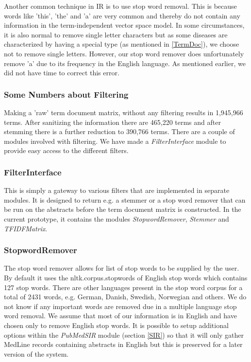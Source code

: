 Another common technique in IR is to use stop word removal. This is
because words like 'this', 'the' and 'a' are very common and thereby
do not contain any information in the term-independent vector space
model. In some circumstances, it is also normal to remove single letter
characters but as some diseases are characterized by having a special
type (as mentioned in \ref{TermDoc}), we choose not to remove single
letters. However, our stop word remover does unfortunately remove 'a'
due to its frequency in the English language. As mentioned earlier, we
did not have time to correct this error.

\subsubsection{Some Numbers about Filtering}
Making a 'raw' term document matrix, without any filtering results in
1,945,966 terms. After sanitizing the information there are 465,220 terms 
and after stemming there is a further reduction to 390,766 terms.
There are a couple of modules involved with filtering. We have made a
\textit{FilterInterface} module to provide easy access to the different
filters.

\subsubsection{FilterInterface}
This is simply a gateway to various filters that are implemented in
separate modules. It is designed to return e.g. a stemmer or a stop
word remover that can be run on the abstracts before the term document
matrix is constructed. In the current prototype, it contains the
modules \textit{StopwordRemover}, \textit{Stemmer} and
\textit{TFIDFMatrix}.

\subsubsection{StopwordRemover}
The stop word remover allows for list of stop words to be supplied by
the user. By default it uses the nltk.corpus.stopwords of English stop
words which contains 127 stop words. There are other languages present
in the stop word corpus for a total of 2431 words, e.g. German,
Danish, Swedish, Norwegian and others. We do not know if any important
words are removed due in a multiple language stop word removal. We
assume that most of our information is in English and have chosen only
to remove English stop words. It is possible to setup additional
options within the \textit{PubMedSIR} module (section \ref{SIR}) so
that it will only gather MedLine records containing abstracts in
English but this is preserved for a later version of the system.

